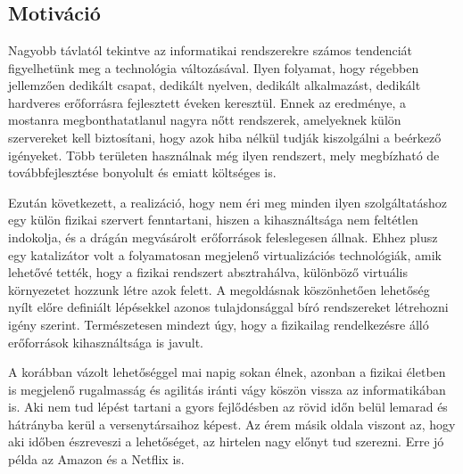 \chapter{\bevezetes}

\section{Motiváció}

Nagyobb távlatól tekintve az informatikai rendszerekre számos tendenciát figyelhetünk meg a technológia változásával.
Ilyen folyamat, hogy régebben jellemzően dedikált csapat, dedikált nyelven, dedikált alkalmazást, dedikált hardveres erőforrásra fejlesztett éveken keresztül. 
Ennek az eredménye, a mostanra megbonthatatlanul nagyra nőtt rendszerek, amelyeknek külön szervereket kell biztosítani, hogy azok hiba nélkül tudják kiszolgálni a beérkező igényeket.
Több területen használnak még ilyen rendszert, mely megbízható de továbbfejlesztése bonyolult és emiatt költséges is.

Ezután következett, a realizáció, hogy nem éri meg minden ilyen szolgáltatáshoz egy külön fizikai szervert fenntartani, hiszen a kihasználtsága nem feltétlen indokolja, és a drágán megvásárolt erőforrások feleslegesen állnak.
Ehhez plusz egy katalizátor volt a folyamatosan megjelenő virtualizációs technológiák, amik lehetővé tették, hogy a fizikai rendszert absztrahálva, különböző virtuális környezetet hozzunk létre azok felett.
A megoldásnak köszönhetően lehetőség nyílt előre definiált lépésekkel azonos tulajdonsággal bíró rendszereket létrehozni igény szerint. 
Természetesen mindezt úgy, hogy a fizikailag rendelkezésre álló erőforrások kihasználtsága is javult.

A korábban vázolt lehetőséggel mai napig sokan élnek, azonban a fizikai életben is megjelenő rugalmasság és agilitás iránti vágy köszön vissza az informatikában is. 
Aki nem tud lépést tartani a gyors fejlődésben az rövid időn belül lemarad és hátrányba kerül a versenytársaihoz képest. 
Az érem másik oldala viszont az, hogy aki időben észreveszi a lehetőséget, az hirtelen nagy előnyt tud szerezni. 
Erre jó példa az Amazon\citep{amazon} és a Netflix\citep{netflix} is.  


